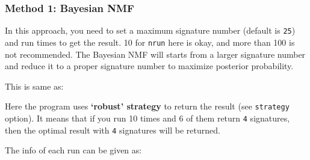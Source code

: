 \documentclass[
  12pt,
  a4paper,
  twoside]{book}
\newenvironment{Shaded}{\begin{snugshade}}{\end{snugshade}}
\newcommand{\AttributeTok}[1]{\textcolor[rgb]{0.77,0.63,0.00}{#1}}
\newcommand{\DecValTok}[1]{\textcolor[rgb]{0.00,0.00,0.81}{#1}}
\newcommand{\FunctionTok}[1]{\textcolor[rgb]{0.00,0.00,0.00}{#1}}
\newcommand{\NormalTok}[1]{#1}
\newcommand{\OtherTok}[1]{\textcolor[rgb]{0.56,0.35,0.01}{#1}}
\newcommand{\SpecialCharTok}[1]{\textcolor[rgb]{0.00,0.00,0.00}{#1}}
\newcommand{\StringTok}[1]{\textcolor[rgb]{0.31,0.60,0.02}{#1}}
\begin{document}
\hypertarget{method-1-bayesian-nmf}{%
\subsubsection{Method 1: Bayesian NMF}\label{method-1-bayesian-nmf}}

In this approach, you need to set a maximum signature number (default is \texttt{25}) and run times to get the result. 10 for \texttt{nrun} here is okay, and more than 100 is not recommended.
The Bayesian NMF will starts from a larger signature number and reduce it to a proper signature number to maximize posterior probability.

\begin{Shaded}
\end{Shaded}

This is same as:

\begin{Shaded}
\end{Shaded}

Here the program uses \textbf{`robust' strategy} to return the result (see \texttt{strategy} option). It means that if you run 10 times and 6 of them return \texttt{4} signatures, then the optimal result with \texttt{4} signatures will be returned.

The info of each run can be given as:

\begin{Shaded}
\end{Shaded}
\end{document}
